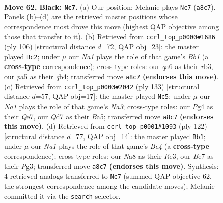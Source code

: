 \documentclass[11pt]{article}
\begin{document}
\clearpage

\begin{figure}[p]\centering
\begin{subfigure}{0.46\textwidth}\centering
\resizebox{\linewidth}{!}{%
\newchessgame
\chessboard[
  setfen={n7/3qbrk1/Q7/P1p2p1p/3p1Pp1/8/1R1BP2P/3N2K1 b - - 0 62},
  showmover=false,
  pgfstyle=straightmove, color=movearrow, markmove={a8-c7}
]}
\caption{}
\end{subfigure}\hfill
\begin{subfigure}{0.46\textwidth}\centering
\resizebox{\linewidth}{!}{%
\newchessgame
\chessboard[
  setfen={8/1p3p2/1P1n3k/3P2p1/1q5p/1r5P/4QPP1/1B1R2K1 w - - 2 54},
  showmover=false,
  pgfstyle=straightmove, color=movearrow, markmove={b1-c2}
]}
\caption{}
\end{subfigure}
\\[4pt]
\begin{subfigure}{0.46\textwidth}\centering
\resizebox{\linewidth}{!}{%
\newchessgame
\chessboard[
  setfen={1r5k/4q3/np1p3P/b2PpBp1/4P1N1/3Q4/5PK1/R7 b - - 2 67},
  showmover=false,
  pgfstyle=straightmove, color=movearrow, markmove={a6-c5}
]}
\caption{}
\end{subfigure}\hfill
\begin{subfigure}{0.46\textwidth}\centering
\resizebox{\linewidth}{!}{%
\newchessgame
\chessboard[
  setfen={2r2k2/5pp1/5b1p/1p3P1P/1P1qB3/P3RQPK/8/8 w - - 17 62},
  showmover=false,
  pgfstyle=straightmove, color=movearrow, markmove={e4-b1}
]}
\caption{}
\end{subfigure}
\caption{\textbf{Move 62, Black: \texttt{Nc7}.} (a) Our position; Melanie plays \texttt{Nc7} (\texttt{a8c7}). Panels (b)--(d) are the retrieved master positions whose correspondence most drove this move (highest QAP objective among those that transfer to it). (b) Retrieved from \texttt{ccrl\_top\_p0000\#1686} (ply 106) [structural distance $d$=72, QAP obj=23]: the master played \texttt{Bc2}; under $\mu$ our \emph{Na1} plays the role of that game's \emph{Bb1} (a \textbf{cross-type} correspondence); cross-type roles: our \emph{q}a6 as their \emph{r}b3, our \emph{p}a5 as their \emph{q}b4; transferred move \texttt{a8c7} \textbf{(endorses this move)}. (c) Retrieved from \texttt{ccrl\_top\_p0003\#2042} (ply 133) [structural distance $d$=57, QAP obj=17]: the master played \texttt{Nc5}; under $\mu$ our \emph{Na1} plays the role of that game's \emph{Na3}; cross-type roles: our \emph{P}g4 as their \emph{Q}e7, our \emph{Q}d7 as their \emph{B}a5; transferred move \texttt{a8c7} \textbf{(endorses this move)}. (d) Retrieved from \texttt{ccrl\_top\_p0001\#1093} (ply 122) [structural distance $d$=77, QAP obj=14]: the master played \texttt{Bb1}; under $\mu$ our \emph{Na1} plays the role of that game's \emph{Be4} (a \textbf{cross-type} correspondence); cross-type roles: our \emph{N}a8 as their \emph{R}e3, our \emph{B}e7 as their \emph{P}g3; transferred move \texttt{a8c7} \textbf{(endorses this move)}. Synthesis: 4 retrieved analogs transferred to \texttt{Nc7} (summed QAP objective 62, the strongest correspondence among the candidate moves); Melanie committed it via the \texttt{search} selector.}
\label{fig:thought-m123}
\end{figure}
\end{document}
